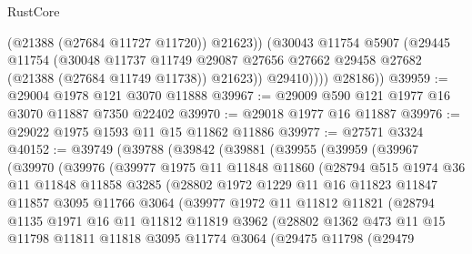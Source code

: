\begin{lexlean}{RustCore}
\begin{coremodule}
                  (@21388 (@27684 @11727 @11720))
                  @21623))
              (@30043
                @11754
                @5907
                (@29445
                  @11754
                  (@30048
                    @11737
                    @11749
                    @29087
                    @27656
                    @27662
                    @29458
                    @27682
                    (@21388 (@27684 @11749 @11738))
                    @21623))
                @29410))))
        @28186))
@39959 := @29004 @1978 @121 @3070 @11888
@39967 := @29009 @590 @121 @1977 @16 @3070 @11887 @7350 @22402
@39970 := @29018 @1977 @16 @11887
@39976 := @29022 @1975 @1593 @11 @15 @11862 @11886
@39977 := @27571 @3324
@40152 := @39749
    (@39788
      (@39842
        (@39881
          (@39955
            (@39959
              (@39967
                (@39970
                  (@39976
                    (@39977
                      @1975
                      @11
                      @11848
                      @11860
                      (@28794
                        @515
                        @1974
                        @36
                        @11
                        @11848
                        @11858
                        @3285
                        (@28802
                          @1972
                          @1229
                          @11
                          @16
                          @11823
                          @11847
                          @11857
                          @3095
                          @11766
                          @3064
                          (@39977
                            @1972
                            @11
                            @11812
                            @11821
                            (@28794
                              @1135
                              @1971
                              @16
                              @11
                              @11812
                              @11819
                              @3962
                              (@28802
                                @1362
                                @473
                                @11
                                @15
                                @11798
                                @11811
                                @11818
                                @3095
                                @11774
                                @3064
                                (@29475
                                  @11798
                                  (@29479

\end{coremodule}
\end{lexlean}
